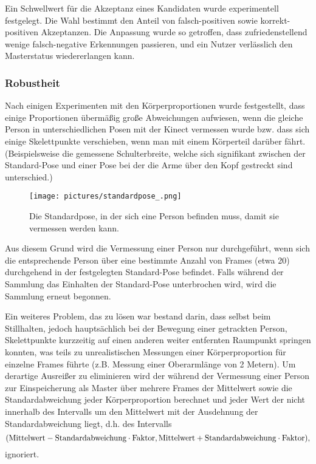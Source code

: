  


Ein Schwellwert für die Akzeptanz eines Kandidaten wurde experimentell festgelegt.
Die Wahl bestimmt den Anteil von falsch-positiven sowie korrekt-positiven Akzeptanzen.
Die Anpassung wurde so getroffen, dass zufriedenstellend wenige falsch-negative Erkennungen passieren, 
und ein Nutzer verlässlich den Masterstatus wiedererlangen kann.









\subsubsection{Robustheit}
Nach einigen Experimenten mit den Körperproportionen wurde festgestellt, dass einige Proportionen übermäßig große Abweichungen aufwiesen, wenn die gleiche Person in unterschiedlichen Posen mit der Kinect vermessen wurde bzw. dass sich einige Skelettpunkte \glqq{}verschieben\grqq{}, wenn man mit einem Körperteil darüber fährt. (Beispielsweise die gemessene Schulterbreite, welche sich signifikant zwischen der Standard-Pose und einer Pose bei der die Arme über den Kopf gestreckt sind unterschied.) 
\begin{figure}[h!]
		\centering
		\texttt{[image: pictures/standardpose\_.png]}
		\caption{Die Standardpose, in der sich eine Person befinden muss, damit sie vermessen werden kann.}\label{fig:standardp}
		\end{figure}
Aus diesem Grund wird die Vermessung einer Person nur durchgeführt, wenn sich die entsprechende Person über eine bestimmte Anzahl von Frames (etwa 20) durchgehend in der festgelegten Standard-Pose befindet. Falls während der Sammlung das Einhalten der Standard-Pose unterbrochen wird, wird die Sammlung erneut begonnen.\par
Ein weiteres Problem, das zu lösen war bestand darin, dass selbst beim Stillhalten, jedoch hauptsächlich bei der Bewegung einer getrackten Person, Skelettpunkte kurzzeitig auf einen anderen weiter entfernten Raumpunkt springen konnten, was teils zu unrealistischen Messungen einer Körperproportion für einzelne Frames führte (z.B. Messung einer Oberarmlänge von 2 Metern). Um derartige Ausreißer zu eliminieren wird der während der Vermessung einer Person zur Einspeicherung als Master über mehrere Frames der Mittelwert sowie die Standardabweichung jeder Körperproportion berechnet und jeder Wert der nicht innerhalb des Intervalls um den Mittelwert mit der Ausdehnung der Standardabweichung liegt, d.h. des Intervalls \[(\text{Mittelwert}-\text{Standardabweichung}\cdot \text{Faktor}, \text{Mittelwert}+\text{Standardabweichung}\cdot \text{Faktor})\text,\] ignoriert. 

